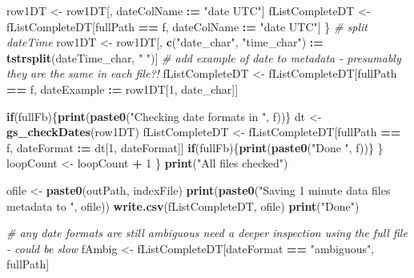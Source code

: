 \documentclass[]{article}
\newenvironment{Shaded}{\begin{snugshade}}{\end{snugshade}}
\newcommand{\KeywordTok}[1]{\textcolor[rgb]{0.13,0.29,0.53}{\textbf{#1}}}
\newcommand{\DecValTok}[1]{\textcolor[rgb]{0.00,0.00,0.81}{#1}}
\newcommand{\StringTok}[1]{\textcolor[rgb]{0.31,0.60,0.02}{#1}}
\newcommand{\CommentTok}[1]{\textcolor[rgb]{0.56,0.35,0.01}{\textit{#1}}}
\newcommand{\ControlFlowTok}[1]{\textcolor[rgb]{0.13,0.29,0.53}{\textbf{#1}}}
\newcommand{\OperatorTok}[1]{\textcolor[rgb]{0.81,0.36,0.00}{\textbf{#1}}}
\newcommand{\ErrorTok}[1]{\textcolor[rgb]{0.64,0.00,0.00}{\textbf{#1}}}
\newcommand{\NormalTok}[1]{#1}
\begin{document}
\begin{Shaded}
\begin{Highlighting}[]
{\NormalTok{        row1DT <-}\StringTok{ }\NormalTok{row1DT[, dateColName }\OperatorTok{:}\ErrorTok{=}\StringTok{ "date UTC"}\NormalTok{]}
\NormalTok{        fListCompleteDT <-}\StringTok{ }\NormalTok{fListCompleteDT[fullPath }\OperatorTok{==}\StringTok{ }\NormalTok{f, dateColName }\OperatorTok{:}\ErrorTok{=}\StringTok{ "date UTC"}\NormalTok{]}
\NormalTok{      \}}
      \CommentTok{# split dateTime}
\NormalTok{      row1DT <-}\StringTok{ }\NormalTok{row1DT[, }\KeywordTok{c}\NormalTok{(}\StringTok{"date_char"}\NormalTok{, }\StringTok{"time_char"}\NormalTok{) }\OperatorTok{:}\ErrorTok{=}\StringTok{ }\KeywordTok{tstrsplit}\NormalTok{(dateTime_char, }\StringTok{" "}\NormalTok{)]}
      \CommentTok{# add example of date to metadata - presumably they are the same in each file?!}
\NormalTok{      fListCompleteDT <-}\StringTok{ }\NormalTok{fListCompleteDT[fullPath }\OperatorTok{==}\StringTok{ }\NormalTok{f, dateExample }\OperatorTok{:}\ErrorTok{=}\StringTok{ }\NormalTok{row1DT[}\DecValTok{1}\NormalTok{, date_char]]}
      
      \ControlFlowTok{if}\NormalTok{(fullFb)\{}\KeywordTok{print}\NormalTok{(}\KeywordTok{paste0}\NormalTok{(}\StringTok{"Checking date formats in "}\NormalTok{, f))\}}
\NormalTok{      dt <-}\StringTok{ }\KeywordTok{gs_checkDates}\NormalTok{(row1DT)}
\NormalTok{      fListCompleteDT <-}\StringTok{ }\NormalTok{fListCompleteDT[fullPath }\OperatorTok{==}\StringTok{ }\NormalTok{f, dateFormat }\OperatorTok{:}\ErrorTok{=}\StringTok{ }\NormalTok{dt[}\DecValTok{1}\NormalTok{, dateFormat]]}
      \ControlFlowTok{if}\NormalTok{(fullFb)\{}\KeywordTok{print}\NormalTok{(}\KeywordTok{paste0}\NormalTok{(}\StringTok{"Done "}\NormalTok{, f))\}}
\NormalTok{    \}}
\NormalTok{    loopCount <-}\StringTok{ }\NormalTok{loopCount }\OperatorTok{+}\StringTok{ }\DecValTok{1}
\NormalTok{  \}}
  \KeywordTok{print}\NormalTok{(}\StringTok{"All files checked"}\NormalTok{)}
  
\NormalTok{  ofile <-}\StringTok{ }\KeywordTok{paste0}\NormalTok{(outPath, indexFile)}
  \KeywordTok{print}\NormalTok{(}\KeywordTok{paste0}\NormalTok{(}\StringTok{"Saving 1 minute data files metadata to "}\NormalTok{, ofile))}
  \KeywordTok{write.csv}\NormalTok{(fListCompleteDT, ofile)}
  \KeywordTok{print}\NormalTok{(}\StringTok{"Done"}\NormalTok{)}
  
  \CommentTok{# any date formats are still ambiguous need a deeper inspection using the full file - could be slow}
\NormalTok{  fAmbig <-}\StringTok{ }\NormalTok{fListCompleteDT[dateFormat }\OperatorTok{==}\StringTok{ "ambiguous"}\NormalTok{, fullPath]}
  
}
\end{Highlighting}
\end{Shaded}
\end{document}
